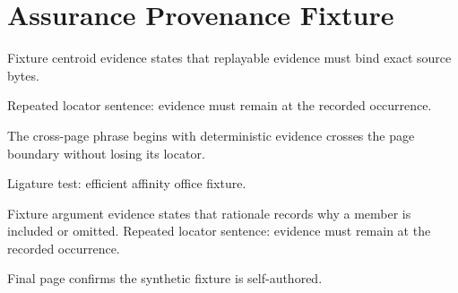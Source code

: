 \documentclass[11pt]{article}
\begin{document}
\section*{Assurance Provenance Fixture}
Fixture centroid evidence states that replayable evidence must bind exact source bytes.

Repeated locator sentence: evidence must remain at the recorded occurrence.

The cross-page phrase begins with deterministic evidence crosses the
\newpage
page boundary without losing its locator.

Ligature test: efficient affinity office fixture.

Fixture argument evidence states that rationale records why a member is included or omitted.
\newpage
Repeated locator sentence: evidence must remain at the recorded occurrence.

Final page confirms the synthetic fixture is self-authored.
\end{document}
